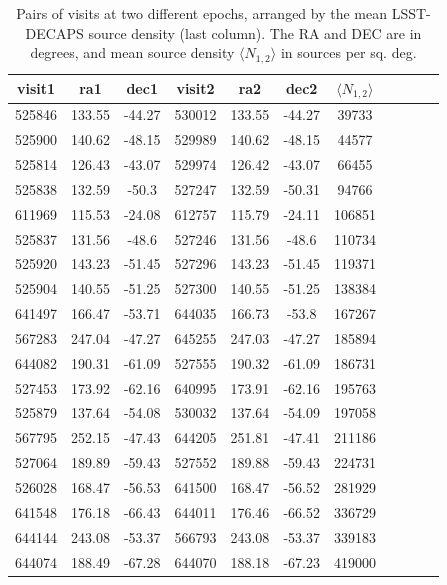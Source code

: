 \documentclass[DM,lsstdraft,toc,usenatbib]{lsstdoc}
\begin{document}
\begin{table}
\centering
\caption{Pairs of visits at two different epochs, arranged by the mean LSST-DECAPS source density (last column). The RA and DEC are in degrees, and mean source density $\langle N_{1,2} \rangle$ in sources per sq. deg.}
\label{tab:epoch12_selection}
\begin{tabular}{ccccccccccc}
\hline
visit1 & ra1 & dec1 & visit2 & ra2 & dec2 & $\langle N_{1,2} \rangle$ \\
\hline
525846 & 133.55 & -44.27 & 530012 & 133.55 & -44.27 & 39733 \\
525900 & 140.62 & -48.15 & 529989 & 140.62 & -48.15 & 44577 \\
525814 & 126.43 & -43.07 & 529974 & 126.42 & -43.07 & 66455 \\
525838 & 132.59 & -50.3 & 527247 & 132.59 & -50.31 & 94766 \\
611969 & 115.53 & -24.08 & 612757 & 115.79 & -24.11 & 106851 \\
525837 & 131.56 & -48.6 & 527246 & 131.56 & -48.6 & 110734 \\
525920 & 143.23 & -51.45 & 527296 & 143.23 & -51.45 & 119371 \\
525904 & 140.55 & -51.25 & 527300 & 140.55 & -51.25 & 138384 \\
641497 & 166.47 & -53.71 & 644035 & 166.73 & -53.8 & 167267 \\
567283 & 247.04 & -47.27 & 645255 & 247.03 & -47.27 & 185894 \\
644082 & 190.31 & -61.09 & 527555 & 190.32 & -61.09 & 186731 \\
527453 & 173.92 & -62.16 & 640995 & 173.91 & -62.16 & 195763 \\
525879 & 137.64 & -54.08 & 530032 & 137.64 & -54.09 & 197058 \\
567795 & 252.15 & -47.43 & 644205 & 251.81 & -47.41 & 211186 \\
527064 & 189.89 & -59.43 & 527552 & 189.88 & -59.43 & 224731 \\
526028 & 168.47 & -56.53 & 641500 & 168.47 & -56.52 & 281929 \\
641548 & 176.18 & -66.43 & 644011 & 176.46 & -66.52 & 336729 \\
644144 & 243.08 & -53.37 & 566793 & 243.08 & -53.37 & 339183 \\
644074 & 188.49 & -67.28 & 644070 & 188.18 & -67.23 & 419000 \\
\hline
\end{tabular}
\end{table}
\end{document}
